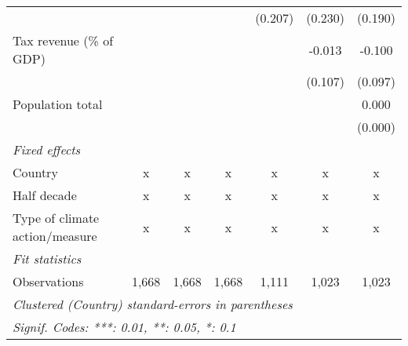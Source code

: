 \begin{tabular}{lcccccc}
                                                                    &         &         &                & (0.207)        & (0.230)      & (0.190)\\   
   Tax revenue (\% of GDP)                                          &         &         &                &                & -0.013       & -0.100\\   
                                                                    &         &         &                &                & (0.107)      & (0.097)\\   
   Population total                                                 &         &         &                &                &              & 0.000\\   
                                                                    &         &         &                &                &              & (0.000)\\   
   \emph{Fixed effects}\\
   Country                                                          & x       & x       & x              & x              & x            & x\\  
   Half decade                                                      & x       & x       & x              & x              & x            & x\\  
   Type of climate action/measure                                   & x       & x       & x              & x              & x            & x\\  
   \midrule \emph{Fit statistics}\\
   Observations                                                     & 1,668   & 1,668   & 1,668          & 1,111          & 1,023        & 1,023\\  
   \midrule
   \multicolumn{7}{l}{\emph{Clustered (Country) standard-errors in parentheses}}\\
   \multicolumn{7}{l}{\emph{Signif. Codes: ***: 0.01, **: 0.05, *: 0.1}}\\
\end{tabular}
\par\endgroup


